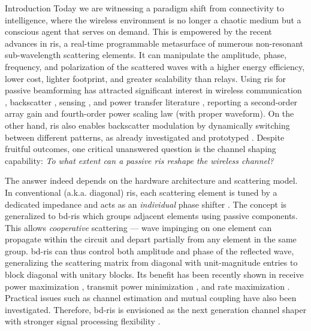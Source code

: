 \documentclass[journal]{IEEEtran}
\begin{document}
\begin{section}{Introduction}
	Today we are witnessing a paradigm shift from connectivity to intelligence, where the wireless environment is no longer a chaotic medium but a conscious agent that serves on demand.
	This is empowered by the recent advances in \gls{ris}, a real-time programmable metasurface of numerous non-resonant sub-wavelength scattering elements.
	It can manipulate the amplitude, phase, frequency, and polarization of the scattered waves \cite{Basar2019} with a higher energy efficiency, lower cost, lighter footprint, and greater scalability than relays.
	Using \gls{ris} for {passive beamforming} has attracted significant interest in wireless communication \cite{Wu2019,Wu2020c,Yang2020,Zheng2021}, backscatter \cite{Jia2020,Liang2022}, sensing \cite{Liu2022a,Hua2023}, and power transfer literature \cite{Wu2021d,Feng2022,Zhao2022}, reporting a second-order array gain and fourth-order power scaling law (with proper waveform).
	On the other hand, \gls{ris} also enables {backscatter modulation} by dynamically switching between different patterns, as already investigated \cite{Karasik2020,Basar2020,Zhao2022a} and prototyped \cite{Tang2019a,Dai2020a}.
	Despite fruitful outcomes, one critical unanswered question is the {channel shaping} capability: \emph{To what extent can a passive \gls{ris} reshape the wireless channel?}

	The answer indeed depends on the hardware architecture and scattering model.
	In conventional (a.k.a. diagonal) \gls{ris}, each scattering element is tuned by a dedicated impedance and acts as an \emph{individual} phase shifter \cite{Wu2020}.
	The concept is generalized to \gls{bd}-\gls{ris} \cite{Shen2020a,Li2023b} which groups adjacent elements using passive components.
	This allows \emph{cooperative} scattering --- wave impinging on one element can propagate within the circuit and depart partially from any element in the same group.
	\gls{bd}-\gls{ris} can thus control both amplitude and phase of the reflected wave, generalizing the scattering matrix from diagonal with unit-magnitude entries to block diagonal with  unitary blocks.
	Its benefit has been recently shown in receive power maximization \cite{Nerini2023,Santamaria2023,Fang2023,Nerini2023a}, transmit power minimization \cite{Zhou2023}, and rate maximization \cite{Zhou2023,Nerini2023a,Li2023d,Bartoli2023,Li2023c}.
	Practical issues such as channel estimation \cite{Li2023e} and mutual coupling \cite{Li2023f} have also been investigated.
	Therefore, \gls{bd}-\gls{ris} is envisioned as the next generation channel shaper with stronger signal processing flexibility \cite{Li2023g}.


\end{section}
\end{document}
